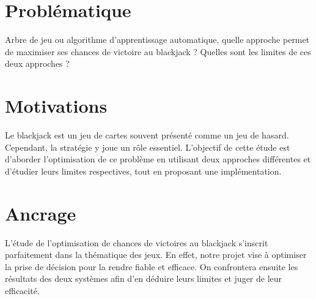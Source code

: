 \section{Problématique}
Arbre de jeu ou algorithme d'apprentissage automatique, 
quelle approche permet de maximiser ses chances de victoire au blackjack ? 
Quelles sont les limites de ces deux approches ?

\section{Motivations}
Le blackjack est un jeu de cartes souvent présenté comme un jeu de hasard.
Cependant, la stratégie y joue un rôle essentiel. 
L'objectif de cette étude est d'aborder l'optimisation de ce problème
en utilisant deux approches différentes et d'étudier 
leurs limites respectives, tout en proposant une implémentation.

\section{Ancrage}
L'étude de l'optimisation de chances de victoires au blackjack 
s'inscrit parfaitement dans la thématique des jeux. 
En effet, notre projet vise à optimiser la prise de décision
pour la rendre fiable et efficace. On confrontera ensuite les résultats 
des deux systèmes afin d'en déduire leurs limites et juger de leur efficacité.

